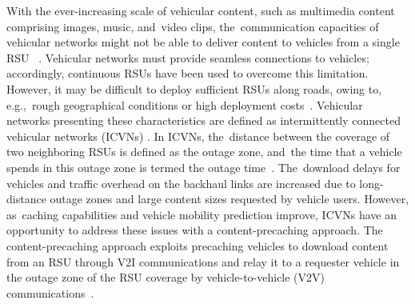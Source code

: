 \documentclass[sensors,aricle,accept,pdftex,moreauthors]{Definitions/mdpi}
\begin{document}
With the ever-increasing scale of vehicular content, such as multimedia content comprising images, music, and~video clips, the~communication capacities of vehicular networks might not be able to deliver content to vehicles from a single RSU ~\cite{Su2017, Zhou2019}.
Vehicular networks must provide seamless connections to vehicles; accordingly, continuous RSUs have been used to overcome this limitation.
However, it may be difficult to deploy sufficient RSUs along roads, owing to, e.g.,~rough geographical conditions or high deployment costs~\cite{Kim2017}.
Vehicular networks presenting these characteristics are defined as intermittently connected vehicular networks (ICVNs) \cite{Wang2017, Suthaputchakun2018}.
In ICVNs, the~distance between the coverage of two neighboring RSUs is defined as the outage zone, and~the time that a vehicle spends in this outage zone is termed the outage time~\cite{Bang2020}.
The~download delays for vehicles and traffic overhead on the backhaul links are increased due to long-distance outage zones and large content sizes requested by vehicle users.
However, as~caching capabilities and vehicle mobility prediction improve, ICVNs have an opportunity to address these issues with a content-precaching approach.
The content-precaching approach exploits precaching vehicles to download content from an RSU through V2I communications and relay it to a requester vehicle in the outage zone of the RSU coverage by vehicle-to-vehicle (V2V) communications~\cite{Wang2017}.
\end{document}
